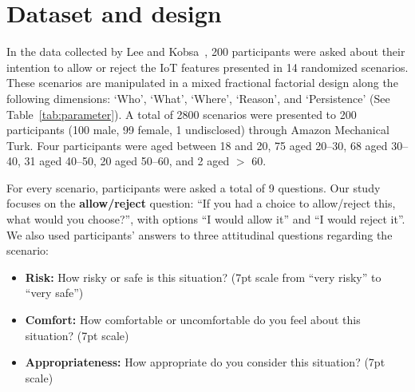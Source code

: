 \section{Dataset and design}
In the data collected by Lee and Kobsa~\cite{lee2016understanding}, 200 participants were asked about their intention to allow or reject the IoT features presented in 14 randomized scenarios. These scenarios are manipulated in a mixed fractional factorial design along the following dimensions: `Who', `What', `Where', `Reason', and `Persistence' (See Table~\ref{tab:parameter}). A total of 2800 scenarios were presented to 200 participants (100 male, 99 female, 1 undisclosed) through Amazon Mechanical Turk. Four participants were aged between 18 and 20, 75 aged 20--30, 68 aged 30--40, 31 aged 40--50, 20 aged 50--60, and 2 aged $>$ 60.

For every scenario, participants were asked a total of 9 questions. Our study focuses on the \textbf{allow/reject} question: ``If you had a choice to allow/reject this, what would you choose?'', with options ``I would allow it'' and ``I would reject it''. We also used participants' answers to three attitudinal questions regarding the scenario:
\begin{itemize}
	\item \textbf{Risk:} How risky or safe is this situation? (7pt scale from ``very risky'' to ``very safe'')
	\item \textbf{Comfort:} How comfortable or uncomfortable do you feel about this situation? (7pt scale)
	\item \textbf{Appropriateness:} How appropriate do you consider this situation? (7pt scale)
\end{itemize}

